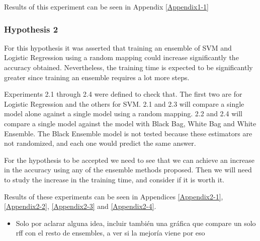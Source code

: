 \begin{pre-delivery}
  Results of this experiment can be seen in Appendix \ref{Appendix1-1}


  \subsubsection*{Hypothesis 2}

  For this hypothesis it was asserted that training an ensemble of SVM and
  Logistic Regression using a random mapping could increase significantly the
  accuracy obtained. Nevertheless, the training time is expected to be
  significantly greater since training an ensemble requires a lot more steps.

  Experiments 2.1 through 2.4 were defined to check that. The first two are for
  Logistic Regression and the others for SVM.
  2.1 and 2.3 will compare a single model alone against a single model using
  a random mapping. 2.2 and 2.4 will compare a single model against the model
  with Black Bag, White Bag and White Ensemble. The Black Ensemble model is not
  tested because these estimators are not randomized, and each one would predict
  the same answer.

  For the hypothesis to be accepted we need to see that we can achieve an
  increase in the accuracy using any of the ensemble methods proposed. Then we
  will need to study the increase in the training time, and consider if it
  is worth it.

  Results of these experiments can be seen in Appendices
  \ref{Appendix2-1},
  \ref{Appendix2-2},
  \ref{Appendix2-3} and
  \ref{Appendix2-4}.
  \end{pre-delivery}

  \begin{note}
    \begin{itemize}
      \item Solo por aclarar alguna idea, incluir también una gráfica que
      compare un solo rff con el resto de ensembles, a ver si la mejoría
      viene por eso
    \end{itemize}
  \end{note}

